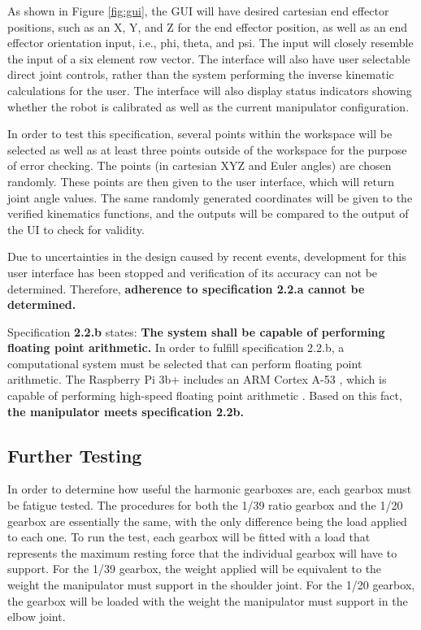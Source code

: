 As shown in Figure \ref{fig:gui}, the GUI will have desired cartesian end effector positions, such as an X, Y, and Z for the end effector position, as well as an end effector orientation input, i.e., phi, theta, and psi. The input will closely resemble the input of a six element row vector. The interface will also have user selectable direct joint controls, rather than the system performing the inverse kinematic calculations for the user. The interface will also display status indicators showing whether the robot is calibrated as well as the current manipulator configuration.

In order to test this specification, several points within the workspace will be selected as well as at least three points outside of the workspace for the purpose of error checking. The points (in cartesian XYZ and Euler angles) are chosen randomly. These points are then given to the user interface, which will return joint angle values. The same randomly generated coordinates will be given to the verified kinematics functions, and the outputs will be compared to the output of the UI to check for validity.

Due to uncertainties in the design caused by recent events, development for this user interface has been stopped and verification of its accuracy can not be determined. Therefore, \textbf{adherence to specification 2.2.a cannot be determined.}


Specification \textbf{2.2.b} states: \textbf{The system shall be capable of performing floating point arithmetic.} In order to fulfill specification 2.2.b, a computational system must be selected that can perform floating point arithmetic. The Raspberry Pi 3b+ includes an ARM Cortex A-53 \cite{rpi}, which is capable of performing high-speed floating point arithmetic \cite{arm}. Based on this fact, \textbf{the manipulator meets specification 2.2b.}


\subsection{Further Testing}

In order to determine how useful the harmonic gearboxes are, each gearbox must be fatigue tested. The procedures for both the 1/39 ratio gearbox and the 1/20 gearbox are essentially the same, with the only difference being the load applied to each one. To run the test, each gearbox will be fitted with a load that represents the maximum resting force that the individual gearbox will have to support. For the 1/39 gearbox, the weight applied will be equivalent to the weight the manipulator must support in the shoulder joint. For the 1/20 gearbox, the gearbox will be loaded with the weight the manipulator must support in the elbow joint.

